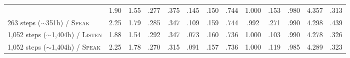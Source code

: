 \begin{table}[t]
{\begin{tabular}{lcc cc ccc cc ccc}
& 1.90 & 1.55 & .277 & .375 & .145 & .150 & .744 & 1.000 & .153 & .980 & 4.357 & .313 \\
263 steps ($\sim$351h) / \textsc{Speak}
& 2.25 & 1.79 & .285 & .347 & .109 & .159 & .744 & .992 & .271 & .990 & 4.298 & .439 \\
1,052 steps ($\sim$1,404h) / \textsc{Listen}
& 1.88 & 1.54 & .292 & .347 & .073 & .160 & .736 & 1.000 & .103 & .990 & 4.278 & .326 \\
1,052 steps ($\sim$1,404h) / \textsc{Speak}
& 2.25 & 1.78 & .270 & .315 & .091 & .157 & .736 & 1.000 & .119 & .985 & 4.289 & .323 \\
\bottomrule
\end{tabular}}
\end{table}
